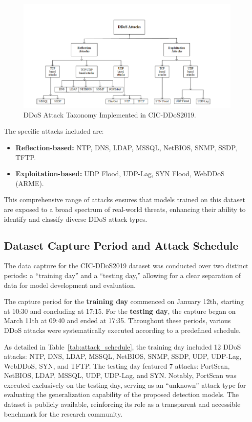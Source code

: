\documentclass[12pt]{report}
\begin{document}
\begin{figure}[htbp]
\centering
\includegraphics[width=\textwidth]{images/ddos_taxonomy.png} %
\caption{DDoS Attack Taxonomy Implemented in CIC-DDoS2019.}
\label{fig:ddos_taxonomy}
\end{figure}

The specific attacks included are:

\begin{itemize}
\item \textbf{Reflection-based:} NTP, DNS, LDAP, MSSQL, NetBIOS, SNMP, SSDP, TFTP.
\item \textbf{Exploitation-based:} UDP Flood, UDP-Lag, SYN Flood, WebDDoS (ARME).
\end{itemize}

This comprehensive range of attacks ensures that models trained on this dataset are exposed to a broad spectrum of real-world threats, enhancing their ability to identify and classify diverse DDoS attack types.

\subsection{Dataset Capture Period and Attack Schedule}

The data capture for the CIC-DDoS2019 dataset was conducted over two distinct periods: a ``training day'' and a ``testing day,'' allowing for a clear separation of data for model development and evaluation.

The capture period for the \textbf{training day} commenced on January 12th, starting at 10:30 and concluding at 17:15. For the \textbf{testing day}, the capture began on March 11th at 09:40 and ended at 17:35. Throughout these periods, various DDoS attacks were systematically executed according to a predefined schedule.

As detailed in Table~\ref{tab:attack_schedule}, the training day included 12 DDoS attacks: NTP, DNS, LDAP, MSSQL, NetBIOS, SNMP, SSDP, UDP, UDP-Lag, WebDDoS, SYN, and TFTP. The testing day featured 7 attacks: PortScan, NetBIOS, LDAP, MSSQL, UDP, UDP-Lag, and SYN. Notably, PortScan was executed exclusively on the testing day, serving as an ``unknown'' attack type for evaluating the generalization capability of the proposed detection models. The dataset is publicly available, reinforcing its role as a transparent and accessible benchmark for the research community.
\end{document}
